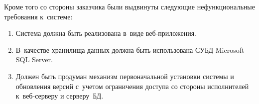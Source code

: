 Кроме того со стороны заказчика были выдвинуты следующие нефункциональные требования к~системе:

\begin{enumerate}
\item{
  Система должна быть реализована в~виде веб-приложения.
}
\item{
  В~качестве хранилища данных должна быть использована СУБД Microsoft SQL Server.
}
\item{
  Должен быть продуман механизм первоначальной установки системы и обновления версий 
  с~учетом ограничения доступа со стороны исполнителей к~веб-серверу и серверу~БД.
}
\end{enumerate}
